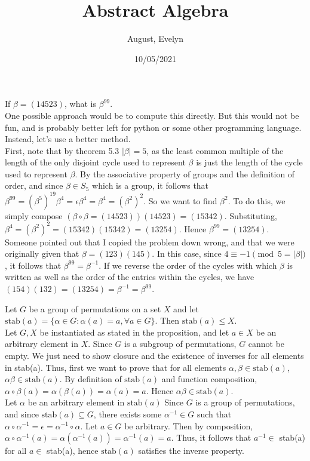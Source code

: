 \documentclass{article}
\title{Abstract Algebra}
\author{August, Evelyn}
\date{10/05/2021}
\newcommand{\stab}{\mbox{stab}}
\begin{document}
\maketitle
{} If $\beta = (14523)$, what is $\beta^{99}$.\\
 One possible approach would be to compute this directly. But this would not be fun, and is probably better left for python or some other programming language. Instead, let's use a better method.\\
First, note that by theorem 5.3 $|\beta| = 5$, as the least common multiple of the length of the only disjoint cycle used to represent $\beta$ is just the length of the cycle used to represent $\beta$. By the associative property of groups and the definition of order, and since $\beta\in S_5$ which is a group, it follows that $\beta^{99} = (\beta^5)^{19}\beta^4 = \epsilon\beta^4 = \beta^4 = (\beta^2)^2$. So we want to find $\beta^2$. To do this, we simply compose $(\beta\circ \beta = (14523))(14523) = (15342).$ Substituting, $\beta^4 = (\beta^2)^2 = (15342)(15342) = (13254)$. Hence $\beta^{99} = (13254)$.\\

 Someone pointed out that I copied the problem down wrong, and that we were originally given that $\beta = (123)(145)$. In this case, since $4\equiv -1\pmod{5 = |\beta|}$, it follows that $\beta^{99} = \beta^{-1}$. If we reverse the order of the cycles with which $\beta$ is written as well as the order of the entries within the cycles, we have $(154)(132)=(13254)=\beta^{-1}=\beta^{99}$.

 Let $G$ be a group of permutations on a set $X$ and let $\stab(a) = \{\alpha\in G : \alpha(a) = a, \forall a\in G\}$. Then $\stab(a)\le X$.\\

 Let $G,X$ be instantiated as stated in the proposition, and let $a\in X$ be an arbitrary element in $X$. Since $G$ is a subgroup of permutations, $G$ cannot be empty. We just need to show closure and the existence of inverses for all elements in stab(a). Thus, first we want to prove that for all elements $\alpha,\beta\in \stab(a)$, $\alpha\beta \in \stab(a)$. By definition of $\stab(a)$ and function composition, $\alpha\circ \beta (a)  = \alpha(\beta(a)) = \alpha(a) = a$. Hence $\alpha\beta\in \stab(a)$.\\

Let $\alpha$ be an arbitrary element in $\stab(a)$ Since $G$ is a group of permutations, and since $\stab(a)\subseteq G$, there exists some $\alpha^{-1} \in G$ such that $\alpha\circ\alpha^{-1} = \epsilon = \alpha^{-1}\circ \alpha$. Let $a\in G$ be arbitrary. Then by composition, $\alpha\circ\alpha^{-1}(a) = \alpha(\alpha^{-1}(a)) = \alpha^{-1}(a)=a$. Thus, it follows that $a^{-1}\in$ stab(a) for all $a \in$ stab(a), hence $\stab(a)$ satisfies the inverse property.\\
\end{document}
